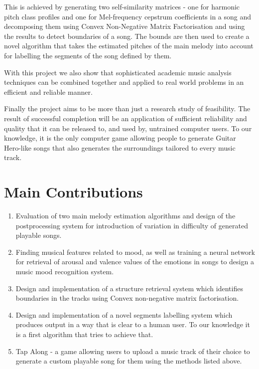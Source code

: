 This is achieved by generating two self-similarity matrices - one for harmonic pitch class profiles and one for Mel-frequency cepstrum coefficients in a song and decomposing them using Convex Non-Negative Matrix Factorisation and using the results to detect boundaries of a song. The bounds are then used to create a novel algorithm that takes the estimated pitches of the main melody into account for labelling the segments of the song defined by them.

With this project we also show that sophisticated academic music analysis techniques can be combined together and applied to real world problems in an efficient and reliable manner. 

Finally the project aims to be more than just a research study of feasibility. The result of successful completion will be an application of sufficient reliability and quality that it can be released to, and used by, untrained computer users. To our knowledge, it is the only computer game allowing people to generate Guitar Hero-like songs that also generates the surroundings tailored to every music track.

\section*{Main Contributions}

\begin{enumerate}
\item Evaluation of two main melody estimation algorithms and design of the postprocessing system for introduction of variation in difficulty of generated playable songs.
\item Finding musical features related to mood, as well as training a neural network for retrieval of arousal and valence values of the emotions in songs to design a music mood recognition system.
\item Design and implementation of a structure retrieval system which identifies boundaries in the tracks using Convex non-negative matrix factorisation.
\item Design and implementation of a novel segments labelling system which produces output in a way that is clear to a human user. To our knowledge it is a first algorithm that tries to achieve that.
\item Tap Along - a game allowing users to upload a music track of their choice to generate a custom playable song for them using the methods listed above.
\end{enumerate}


